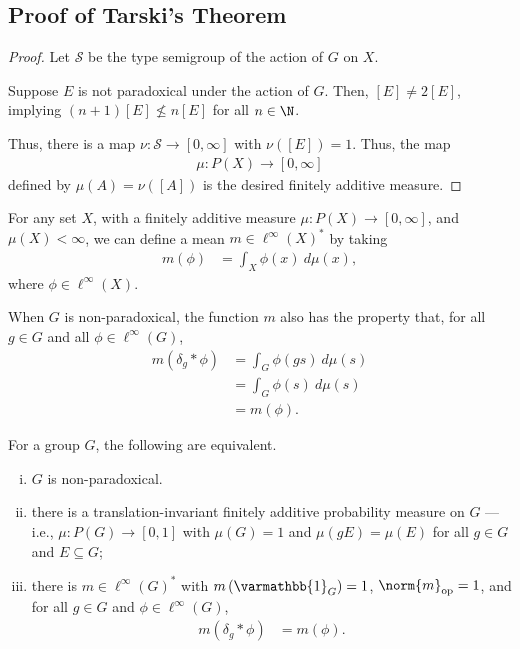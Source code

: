 \documentclass[10pt]{mypackage}
\renewcommand*{\mathbb}[1]{\varmathbb{#1}}
\begin{document}
  \subsection{Proof of Tarski's Theorem}%
  \begin{proof}
    Let $\mathcal{S}$ be the type semigroup of the action of $G$ on $X$.\newline

    Suppose $E$ is not paradoxical under the action of $G$. Then, $\left[E\right] \neq 2\left[E\right]$, implying $\left(n+1\right)\left[E\right]\nleq n\left[E\right]$ for all $n\in \N$.\newline

    Thus, there is a map $\nu: \mathcal{S} \rightarrow [0,\infty]$ with $\nu\left(\left[E\right]\right) = 1$. Thus, the map
    \begin{align*}
      \mu: P\left(X\right)\rightarrow [0,\infty]
    \end{align*}
    defined by $\mu\left(A\right) = \nu\left(\left[A\right]\right)$ is the desired finitely additive measure.
  \end{proof}
  For any set $X$, with a finitely additive measure $\mu: P\left(X\right)\rightarrow [0,\infty]$, and $\mu(X) < \infty$, we can define a mean $m\in \ell^{\infty}\left(X\right)^{\ast}$ by taking
  \begin{align*}
    m\left(\phi\right) &= \int_{X}^{} \phi(x)\:d\mu(x),
  \end{align*}
  where $\phi \in \ell^{\infty}\left(X\right)$.\newline

  When $G$ is non-paradoxical, the function $m$ also has the property that, for all $g\in G$ and all $\phi \in \ell^{\infty}\left(G\right)$,
  \begin{align*}
    m\left(\delta_{g}\ast \phi\right) &= \int_{G}^{} \phi\left(gs\right)\:d\mu(s)\\
                                      &= \int_{G}^{} \phi\left(s\right)\:d\mu(s)\\
                                      &= m\left(\phi\right).
  \end{align*}
  \begin{corollary}
    For a group $G$, the following are equivalent.
    \begin{enumerate}[(i)]
      \item $G$ is non-paradoxical.
      \item there is a translation-invariant finitely additive probability measure on $G$ --- i.e., $\mu: P(G)\rightarrow [0,1]$ with $\mu(G) = 1$ and $\mu(gE) = \mu(E)$ for all $g\in G$ and $E\subseteq G$;
      \item there is $m\in \ell^{\infty}\left(G\right)^{\ast}$ with $m\left(\mathbb{1}_{G}\right) = 1$, $\norm{m}_{\text{op}} = 1$, and for all $g\in G$ and $\phi \in \ell^{\infty}\left(G\right)$,
        \begin{align*}
          m\left(\delta_{g}\ast \phi\right) &= m\left(\phi\right).
        \end{align*}
    \end{enumerate}
  \end{corollary}
\end{document}
